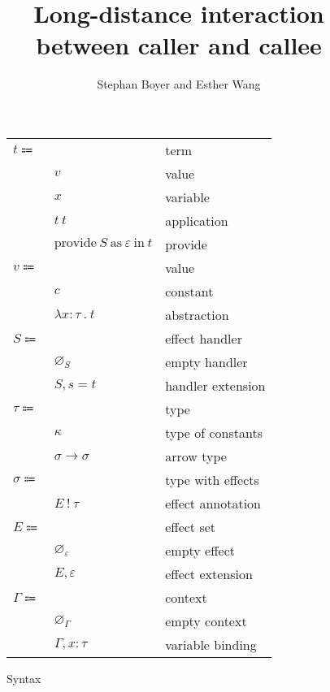 \documentclass[12pt]{article}
\title{Long-distance interaction \\ between caller and callee}
\author{Stephan Boyer and Esther Wang}
\date{}
\newcommand\eterm{t}
\newcommand\evalue{v}
\newcommand\econst{c}
\newcommand\evar{x}
\newcommand\eabs[2]{\lambda #1 \ . \ #2}
\newcommand\eapp[2]{#1 \ #2}
\newcommand\eprovide[3]{\text{provide} \ #1 \ \text{as} \ #2 \ \text{in} \ #3}
\newcommand\pall{S}
\newcommand\pname{s}
\newcommand\pitem[2]{#1 = #2}
\newcommand\pempty{\varnothing_{\pall}}
\newcommand\pextend[2]{#1, #2}
\newcommand\ttype{\tau}
\newcommand\tconst{\kappa}
\newcommand\tarrow[2]{#1 \rightarrow #2}
\newcommand\tanno[2]{#1 : #2}
\newcommand\twithx{\sigma}
\newcommand\tx[2]{#1 \ ! \ #2}
\newcommand\xeffect{\varepsilon}
\newcommand\xeffects{E}
\newcommand\xempty{\varnothing_{\xeffect}}
\newcommand\xextend[2]{#1, #2}
\newcommand\ccontext{\Gamma}
\newcommand\cempty{\varnothing_{\ccontext}}
\newcommand\cextend[3]{#1, \tanno{#2}{#3}}
\begin{document}
  \maketitle

  \begin{figure}
    \begin{mdframed}
      \begin{center}
        \begin{tabular}{l l l}
          $\eterm \Coloneqq $ & & term \\
          & $\evalue$ & value \\
          & $\evar$ & variable \\
          & $\eapp{\eterm}{\eterm}$ & application \\
          & $\eprovide{\pall}{\xeffect}{\eterm}$ & provide \\
          $\evalue \Coloneqq $ & & value \\
          & $\econst$ & constant \\
          & $\eabs{\tanno{\evar}{\ttype}}{\eterm}$ & abstraction \\
          $\pall \Coloneqq$ & & effect handler \\
          & $\pempty$ & empty handler \\
          & $\pextend{\pall}{\pitem{\pname}{\eterm}}$ & handler extension \\
          $\ttype \Coloneqq$ & & type \\
          & $\tconst$ & type of constants \\
          & $\tarrow{\twithx}{\twithx}$ & arrow type \\
          $\twithx \Coloneqq$ & & type with effects \\
          & $\tx{\xeffects}{\ttype}$ & effect annotation \\
          $\xeffects \Coloneqq$ & & effect set \\
          & $\xempty$ & empty effect \\
          & $\xextend{\xeffects}{\xeffect}$ & effect extension \\
          $\ccontext \Coloneqq$ & & context \\
          & $\cempty$ & empty context \\
          & $\cextend{\ccontext}{\evar}{\ttype}$ & variable binding \\
        \end{tabular}
      \end{center}

      \caption{Syntax}
      \label{fig:syntax}
    \end{mdframed}
  \end{figure}
\end{document}
